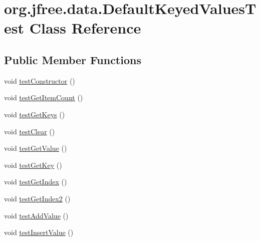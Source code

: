 \hypertarget{classorg_1_1jfree_1_1data_1_1_default_keyed_values_test}{}\section{org.\+jfree.\+data.\+Default\+Keyed\+Values\+Test Class Reference}
\label{classorg_1_1jfree_1_1data_1_1_default_keyed_values_test}
\subsection*{Public Member Functions}
\begin{DoxyCompactItemize}
\item 
void \mbox{\hyperlink{classorg_1_1jfree_1_1data_1_1_default_keyed_values_test_af9962b793e428ed06772d9a22b8ae8a1}{test\+Constructor}} ()
\item 
void \mbox{\hyperlink{classorg_1_1jfree_1_1data_1_1_default_keyed_values_test_a7dbdb825427040acbe844b41094b487b}{test\+Get\+Item\+Count}} ()
\item 
void \mbox{\hyperlink{classorg_1_1jfree_1_1data_1_1_default_keyed_values_test_acbe73e44b053182ca39208740f978102}{test\+Get\+Keys}} ()
\item 
void \mbox{\hyperlink{classorg_1_1jfree_1_1data_1_1_default_keyed_values_test_a5dadbc0f9b107526fd0bd29690848e81}{test\+Clear}} ()
\item 
void \mbox{\hyperlink{classorg_1_1jfree_1_1data_1_1_default_keyed_values_test_a245dd78fe3dc55f2b905d24b6e7a236f}{test\+Get\+Value}} ()
\item 
void \mbox{\hyperlink{classorg_1_1jfree_1_1data_1_1_default_keyed_values_test_a707794a4d607436273df1ffa116b9983}{test\+Get\+Key}} ()
\item 
void \mbox{\hyperlink{classorg_1_1jfree_1_1data_1_1_default_keyed_values_test_aca1966fae316513af3a66ba8f7c853b5}{test\+Get\+Index}} ()
\item 
void \mbox{\hyperlink{classorg_1_1jfree_1_1data_1_1_default_keyed_values_test_aabe14ae4d61cbb95d371c78c38d622db}{test\+Get\+Index2}} ()
\item 
void \mbox{\hyperlink{classorg_1_1jfree_1_1data_1_1_default_keyed_values_test_a4ef3ae69a6a349c8ed66833a08806d6b}{test\+Add\+Value}} ()
\item 
void \mbox{\hyperlink{classorg_1_1jfree_1_1data_1_1_default_keyed_values_test_a876c9a4cab0ec9006421207fedfe6e8e}{test\+Insert\+Value}} ()
\item 

\end{DoxyCompactItemize}
